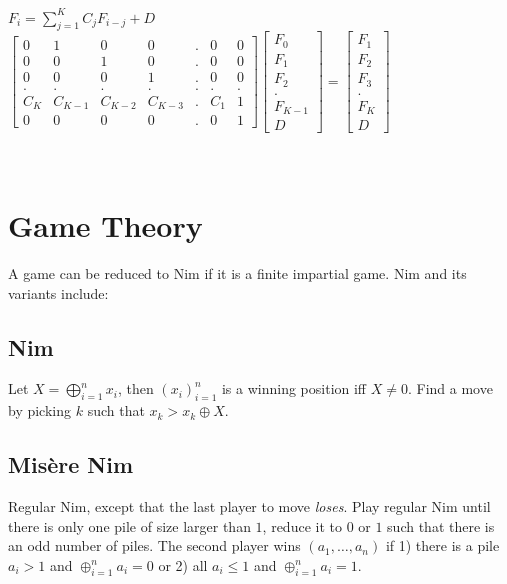 $F_i = \sum_{j=1}^{K} C_j F_{i-j} + D$\\

{   
  \scriptsize
  $\begin{bmatrix}
    0 & 1 & 0 & 0 & . & 0 & 0\\
    0 & 0 & 1 & 0 & . & 0 & 0\\
    0 & 0 & 0 & 1 & . & 0 & 0\\
    . & . & . & . & . & . & .\\
    C_K & C_{K-1} & C_{K-2} & C_{K-3} & . & C_{1} & 1\\
    0 & 0 & 0 & 0 & . & 0 & 1
  \end{bmatrix} 
  \begin{bmatrix}
  F_0\\
  F_1\\
  F_2\\
  .\\
  F_{K-1}\\
  D
  \end{bmatrix} =
  \begin{bmatrix}
    F_1\\
    F_2\\
    F_3\\
    .\\
    F_K\\
    D
  \end{bmatrix}$
}

\


\section{Game Theory}
A game can be reduced to Nim if it is a finite impartial game.
Nim and its variants include:

\subsection{Nim}
	Let $X = \bigoplus_{i=1}^n x_i$, then $(x_i)_{i=1}^n$ is a winning position iff $X\neq 0$. Find a move by picking $k$ such that $x_k > x_k \oplus X$.
	
\subsection{Mis\`{e}re Nim} 
    Regular Nim, except that the last player to move \textit{loses}. Play regular Nim until there is only one pile of size larger than $1$, reduce it to $0$ or $1$ such that there is an odd number of piles. The second player wins $(a_1, \dots, a_n)$ if 1) there is a pile $a_i > 1$ and $\oplus_{i=1}^{n} a_i = 0$ or 2) all $a_i \leq 1$ and $\oplus_{i=1}^{n} a_i = 1$.

